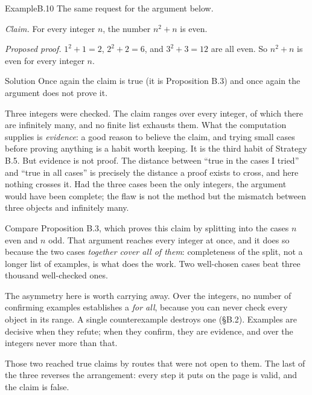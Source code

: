 \documentclass[a4paper,12pt,oneside]{memoir}
\begin{document}
\begin{workedexample}
\begin{envexample}{Example}{B.10}{}
The same request for the argument below.

\emph{Claim.} For every integer \(n\), the number \(n^{2} + n\) is even.

\emph{Proposed proof.} \(1^{2} + 1 = 2\), \(2^{2} + 2 = 6\), and \(3^{2} + 3 = 12\) are all even. So \(n^{2} + n\) is even for every integer \(n\).
\end{envexample}
\begin{envsolution}{Solution}{}{}
Once again the claim is true (it is Proposition B.3) and once again the argument does not prove it.

Three integers were checked. The claim ranges over every integer, of which there are infinitely many, and no finite list exhausts them. What the computation supplies is \emph{evidence}: a good reason to believe the claim, and trying small cases before proving anything is a habit worth keeping. It is the third habit of Strategy B.5. But evidence is not proof. The distance between “true in the cases I tried” and “true in all cases” is precisely the distance a proof exists to cross, and here nothing crosses it. Had the three cases been the only integers, the argument would have been complete; the flaw is not the method but the mismatch between three objects and infinitely many.

Compare Proposition B.3, which proves this claim by splitting into the cases \(n\) even and \(n\) odd. That argument reaches every integer at once, and it does so because the two cases \emph{together cover all of them}: completeness of the split, not a longer list of examples, is what does the work. Two well-chosen cases beat three thousand well-checked ones.

The asymmetry here is worth carrying away. Over the integers, no number of confirming examples establishes a \emph{for all}, because you can never check every object in its range. A single counterexample destroys one (§B.2). Examples are decisive when they refute; when they confirm, they are evidence, and over the integers never more than that.
\end{envsolution}
\end{workedexample}
Those two reached true claims by routes that were not open to them. The last of the three reverses the arrangement: every step it puts on the page is valid, and the claim is false.
\end{document}
